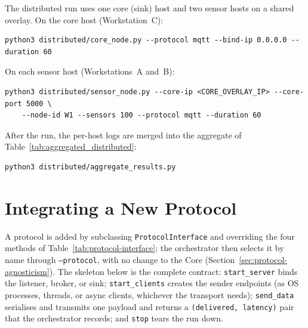 \documentclass[jsan,article,submit,moreauthors,pdftex]{Definitions/mdpi}
\begin{document}
The distributed run uses one core (sink) host and two sensor hosts on a shared overlay. On the core host (Workstation~C):
\begin{lstlisting}[frame=single, basicstyle=\footnotesize\ttfamily, framesep=4pt, breaklines=true]
python3 distributed/core_node.py --protocol mqtt --bind-ip 0.0.0.0 --duration 60
\end{lstlisting}
On each sensor host (Workstations~A and~B):
\begin{lstlisting}[frame=single, basicstyle=\footnotesize\ttfamily, framesep=4pt, breaklines=true]
python3 distributed/sensor_node.py --core-ip <CORE_OVERLAY_IP> --core-port 5000 \
    --node-id W1 --sensors 100 --protocol mqtt --duration 60
\end{lstlisting}
After the run, the per-host logs are merged into the aggregate of Table~\ref{tab:aggregated_distributed}:
\begin{lstlisting}[frame=single, basicstyle=\footnotesize\ttfamily, framesep=4pt, breaklines=true]
python3 distributed/aggregate_results.py
\end{lstlisting}
\section{Integrating a New Protocol}
\label{app:protocol}

A protocol is added by subclassing \texttt{ProtocolInterface} and overriding the four methods of Table~\ref{tab:protocol-interface}; the orchestrator then selects it by name through \texttt{--protocol}, with no change to the Core (Section~\ref{sec:protocol-agnosticism}). The skeleton below is the complete contract: \texttt{start\_server} binds the listener, broker, or sink; \texttt{start\_clients} creates the sender endpoints (as OS processes, threads, or async clients, whichever the transport needs); \texttt{send\_data} serialises and transmits one payload and returns a \texttt{(delivered, latency)} pair that the orchestrator records; and \texttt{stop} tears the run down.
\end{document}
